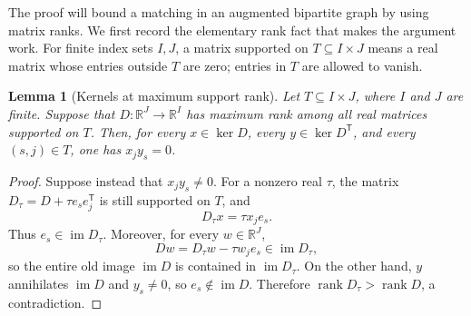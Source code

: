 \documentclass[11pt]{article}
\newtheorem{lemma}[theorem]{Lemma}
\theoremstyle{remark}
\DeclareMathOperator{\rank}{rank}
\DeclareMathOperator{\im}{im}
\newcommand{\R}{\mathbb R}
\begin{document}
The proof will bound a matching in an augmented bipartite graph by using
matrix ranks.  We first record the elementary rank fact that makes the
argument work.  For finite index sets $I,J$, a matrix supported on
$T\subseteq I\times J$ means a real matrix whose entries outside $T$ are
zero; entries in $T$ are allowed to vanish.

\begin{lemma}[Kernels at maximum support rank]\label{lem:kernel-support}
Let $T\subseteq I\times J$, where $I$ and $J$ are finite.  Suppose that
$D:\R^J\to\R^I$ has maximum rank among all real matrices supported on $T$.
Then, for every $x\in\ker D$, every $y\in\ker D^{\mathsf T}$, and every
$(s,j)\in T$, one has $x_jy_s=0$.
\end{lemma}

\begin{proof}
Suppose instead that $x_jy_s\ne0$.  For a nonzero real $\tau$, the matrix
$D_\tau=D+\tau e_s e_j^{\mathsf T}$ is still supported on $T$, and
\[
 D_\tau x=\tau x_j e_s.
\]
Thus $e_s\in\im D_\tau$.  Moreover, for every $w\in\R^J$,
\[
 Dw=D_\tau w-\tau w_j e_s\in\im D_\tau,
\]
so the entire old image $\im D$ is contained in $\im D_\tau$.
On the other hand, $y$ annihilates $\im D$ and $y_s\ne0$, so
$e_s\notin\im D$.  Therefore $\rank D_\tau>\rank D$, a contradiction.
\end{proof}
\end{document}
